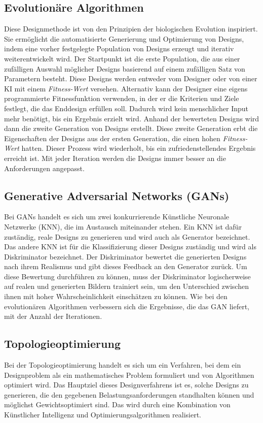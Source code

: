 \subsection*{Evolutionäre Algorithmen}
Diese Designmethode ist von den Prinzipien der biologischen Evolution inspiriert. Sie ermöglicht die automatisierte Generierung und Optimierung von Designs, indem eine vorher festgelegte Population von Designs erzeugt und iterativ weiterentwickelt wird.
Der Startpunkt ist die erste Population, die aus einer zufälligen Auswahl möglicher Designs basierend auf einem zufälligen Satz von Parametern besteht. Diese Designs werden entweder vom Designer oder von einer KI mit einem \textit{Fitness-Wert} versehen. Alternativ kann der Designer eine eigens programmierte Fitnessfunktion verwenden, in der er die Kriterien und Ziele festlegt, die das Enddesign erfüllen soll. Dadurch wird kein menschlicher Input mehr benötigt, bis ein Ergebnis erzielt wird. Anhand der bewerteten Designs wird dann die zweite Generation von Designs erstellt. Diese zweite Generation erbt die Eigenschaften der Designs aus der ersten Generation, die einen hohen \textit{Fitness-Wert} hatten. Dieser Prozess wird wiederholt, bis ein zufriedenstellendes Ergebnis erreicht ist. Mit jeder Iteration werden die Designs immer besser an die Anforderungen angepasst.\autocite{3}

\subsection*{Generative Adversarial Networks (GANs)}
Bei \ac*{GANs} handelt es sich um zwei konkurrierende Künstliche Neuronale Netzwerke (\ac*{KNN}), die im Austausch miteinander stehen. Ein \ac*{KNN} ist dafür zuständig, reale Designs zu generieren und wird auch als Generator bezeichnet. Das andere \ac*{KNN} ist für die Klassifizierung dieser Designs zuständig und wird als Diskriminator bezeichnet. Der Diskriminator bewertet die generierten Designs nach ihrem Realismus und gibt dieses Feedback an den Generator zurück. Um diese Bewertung durchführen zu können, muss der Diskriminator logischerweise auf realen und generierten Bildern trainiert sein, um den Unterschied zwischen ihnen mit hoher Wahrscheinlichkeit einschätzen zu können. Wie bei den evolutionären Algorithmen verbessern sich die Ergebnisse, die das \ac*{GAN} liefert, mit der Anzahl der Iterationen.\autocite{4}\autocite{11}

\subsection*{Topologieoptimierung}
Bei der Topologieoptimierung handelt es sich um ein Verfahren, bei dem ein Designproblem als ein mathematisches Problem formuliert und von Algorithmen optimiert wird. Das Hauptziel dieses Designverfahrens ist es, solche Designs zu generieren, die den gegebenen Belastungsanforderungen standhalten können und möglichst Gewichtsoptimiert sind. Das wird durch eine Kombination von Künstlicher Intelligenz und Optimierungsalgorithmen realisiert. 

